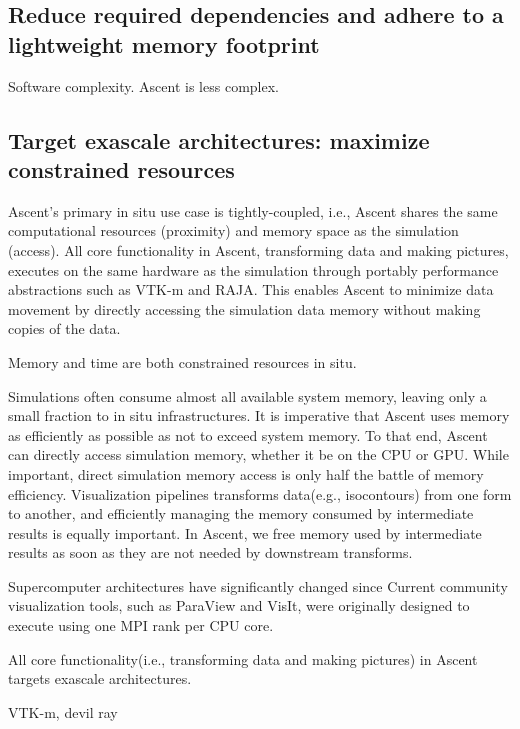 
\subsection{Reduce required dependencies and adhere to a lightweight memory footprint}
Software complexity. Ascent is less complex.

\subsection{Target exascale architectures: maximize constrained resources}
Ascent's primary in situ use case is tightly-coupled, i.e.,
Ascent shares the same computational resources (proximity) and
memory space as the simulation (access).
%
All core functionality in Ascent, transforming data
and making pictures, executes on the same hardware as the
simulation through portably performance abstractions such as
VTK-m and RAJA.
%
This enables Ascent to minimize data movement by directly accessing
the simulation data memory without making copies of the data.
%

Memory and time are both constrained resources in situ.

%
Simulations often consume almost all available system memory,
leaving only a small fraction to in situ infrastructures.
%
It is imperative that Ascent uses memory as efficiently as possible
as not to exceed system memory.
%
To that end, Ascent can directly access simulation memory, whether it be
on the CPU or GPU.
%
While important, direct simulation memory access is only half
the battle of memory efficiency.
%
Visualization pipelines transforms data(e.g., isocontours) from
one form to another, and efficiently managing the memory consumed
by intermediate results is equally important.
%
%
In Ascent, we free memory used by intermediate results as soon
as they are not needed by downstream transforms.
%


%
Supercomputer architectures have significantly changed since
%
Current community visualization tools, such as ParaView and VisIt, were originally
designed to execute using one MPI rank per CPU core.
%

All core functionality(i.e., transforming data and making pictures) in
Ascent targets exascale architectures.

VTK-m, devil ray

